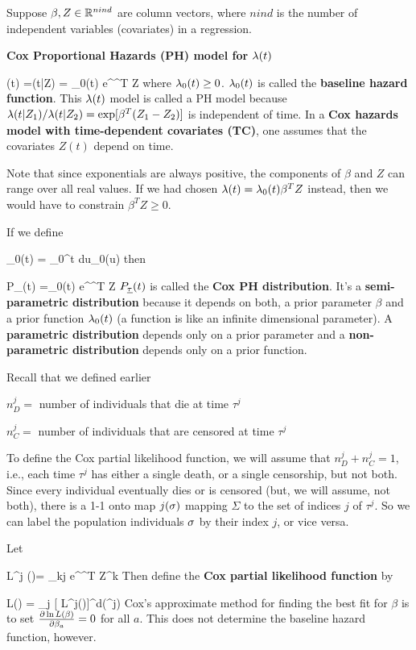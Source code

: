 Suppose $\beta, Z\in { \mathbb{R}}^{nind}$ are
column vectors, where $nind$ is the
number of independent variables (covariates)
in a regression.

{\bf Cox Proportional Hazards (PH) model for
$\lambda(t)$}

\beq
\lam(t) =\lam(t|Z) = \lam_0(t) e^{\beta^T Z}
\eeq
where $\lambda_0(t)\geq 0$.
$\lambda_0(t)$
is called the {\bf baseline
hazard function}.
This $\lambda(t)$  model is called a
PH model because
$\lambda(t|Z_1)/\lambda(t|Z_2)=
\exp[\beta^T(Z_1-Z_2)]$
is independent of time.
In a {\bf Cox hazards model with time-dependent covariates (TC)},
one assumes that the covariates
$Z(t)$ depend on time.

Note that since exponentials
are always positive, the components
of $\beta$ and $Z$ can
range over all real values.
If we had chosen
$\lambda(t) = \lambda_0(t)\beta^T Z$
instead, then we would have
to constrain $\beta^TZ\geq 0$.

If we define

\beq
\Lambda_0(t) = \int_0^t du\;\lam_0(u)
\eeq
then

\beq
P_\rvtau(t) =\lam_0(t) e^{\beta^T Z} 
\eeq
$P_\rvtau(t)$ is called the {\bf Cox PH distribution}.
It's a {\bf semi-parametric distribution}
because it depends on both, a prior
parameter $\beta$ and a prior function $\lambda_0(t)$
(a function is like an infinite dimensional parameter).
A {\bf parametric  distribution}
depends only on a prior parameter and
a {\bf non-parametric  distribution}
depends only on a prior function.

Recall that we defined earlier

$n_D^j=$ number of individuals
that die  at time $\tau^j$


$n_C^j=$ number of individuals
that are censored at time $\tau^j$


To define the Cox partial likelihood function,
we will assume that $n^j_D + n^j_C =1$, i.e.,
each time $\tau^j$ has either
a single death, or a single censorship, but not both.
Since every individual
eventually dies or is censored (but, we will assume, not both),
there is a 1-1 onto map $j(\sigma)$ mapping $\Sigma$ to the set
of indices $j$ of $\tau^j$. So we can label the population individuals
$\sigma$ by
their index $j$, or vice versa.

Let

\beq
 L^j (\beta)=
{\sum_{k\geq j} e^{\beta^T Z^{k}}}
\eeq
Then define the {\bf Cox partial likelihood function} by


\beq
 L(\beta) = \prod_j [ L^j(\beta)]^{{d(\tau^j})}
\eeq
Cox's approximate method for finding
the best fit for $\beta$
is to set $
\frac{\partial\ln  L(\beta)}{\partial\beta_a} =0$
for all $a$. This does not determine the
baseline hazard function, however.

